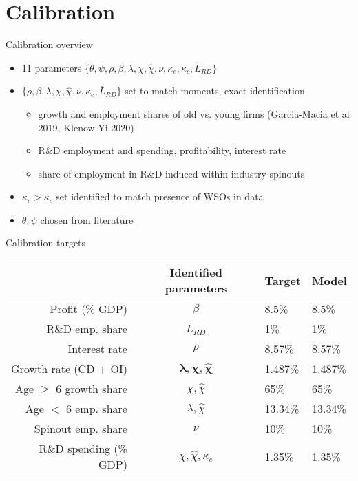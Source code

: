 \documentclass[english,usenames,dvipsnames]{beamer}
\begin{document}
\section{Calibration}


\begin{frame}
\tableofcontents[currentsection]
\end{frame}

\begin{frame}{Calibration overview}\label{calibration_overview}
	\begin{itemize}
		\item 11 parameters $\{\theta, \psi, \rho, \beta, \lambda , \chi, \hat{\chi}, \nu, \kappa_e, \kappa_c, \bar{L}_{RD} \}$
		\medskip
		\item $\{\rho, \beta, \lambda ,\chi, \hat{\chi}, \nu, \kappa_e, \bar{L}_{RD} \}$ set to match moments, exact identification
		\begin{itemize}
			\item growth and employment shares of old vs. young firms (Garcia-Macia et al 2019, Klenow-Yi 2020)
			\item R\&D employment and spending, profitability, interest rate
			\item share of employment in R\&D-induced within-industry spinouts	\hyperlink{economic_magnitude}{}  
		\end{itemize}
		\smallskip
		\item $\kappa_c > \bar{\kappa}_{c}$ set identified to match presence of WSOs in data
		\smallskip
		\item $\theta, \psi$ chosen from literature
	\end{itemize}
\end{frame}

\begin{frame}{Calibration targets}\label{calibration_targets}
\begin{table}[]
	\centering
	\small
	\begin{tabular}{rcll}
		\toprule \toprule
		& Identified parameters & Target & Model \tabularnewline
		\midrule
		Profit (\% GDP) & $\beta$ & 8.5\% & 8.5\% 
		\tabularnewline
		R\&D emp. share & $\bar{L}_{RD}$ & 1\% & 1\% 
		\tabularnewline
		Interest rate & $\rho$ & 8.57\% & 8.57\% 
		\tabularnewline
		Growth rate (CD + OI) & $\mathbf{\lambda, \chi, \hat{\chi}}$ & 1.487\% & 1.487\%
		\tabularnewline		
		Age $\ge$ 6 growth share & $\chi, \hat{\chi}$  & 65\% & 65\%
		\tabularnewline
		Age $<$ 6 emp. share  & $\lambda, \hat{\chi}$ & 13.34\% & 13.34\%
		\tabularnewline
		Spinout emp. share &$\nu$  & 10\% & 10\%
		\tabularnewline
		R\&D spending (\% GDP) & $\chi, \hat{\chi}, \kappa_e$  & 1.35\% & 1.35\%
		\tabularnewline
		\bottomrule
	\end{tabular}
\end{table}
\end{frame}
\end{document}
